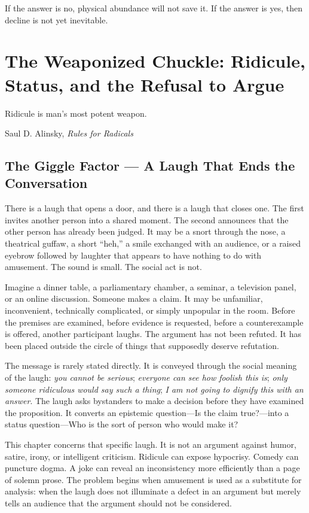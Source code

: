 ﻿\documentclass[12pt,a4paper]{book}
\begin{document}
If the answer is no, physical abundance will not save it. If the answer is yes, then decline is not yet inevitable.


\chapter[The Weaponized Chuckle]{The Weaponized Chuckle: Ridicule, Status, and the Refusal to Argue}

\epigraph{Ridicule is man's most potent weapon.}{Saul D. Alinsky, \emph{Rules for Radicals} \cite{alinsky1971}}

\section{The Giggle Factor --- A Laugh That Ends the Conversation}

There is a laugh that opens a door, and there is a laugh that closes one. The first invites another person into a shared moment. The second announces that the other person has already been judged. It may be a snort through the nose, a theatrical guffaw, a short ``heh,'' a smile exchanged with an audience, or a raised eyebrow followed by laughter that appears to have nothing to do with amusement. The sound is small. The social act is not.

Imagine a dinner table, a parliamentary chamber, a seminar, a television panel, or an online discussion. Someone makes a claim. It may be unfamiliar, inconvenient, technically complicated, or simply unpopular in the room. Before the premises are examined, before evidence is requested, before a counterexample is offered, another participant laughs. The argument has not been refuted. It has been placed outside the circle of things that supposedly deserve refutation.

The message is rarely stated directly. It is conveyed through the social meaning of the laugh: \emph{you cannot be serious}; \emph{everyone can see how foolish this is}; \emph{only someone ridiculous would say such a thing}; \emph{I am not going to dignify this with an answer}. The laugh asks bystanders to make a decision before they have examined the proposition. It converts an epistemic question---Is the claim true?---into a status question---Who is the sort of person who would make it?

This chapter concerns that specific laugh. It is not an argument against humor, satire, irony, or intelligent criticism. Ridicule can expose hypocrisy. Comedy can puncture dogma. A joke can reveal an inconsistency more efficiently than a page of solemn prose. The problem begins when amusement is used as a substitute for analysis: when the laugh does not illuminate a defect in an argument but merely tells an audience that the argument should not be considered.
\end{document}
